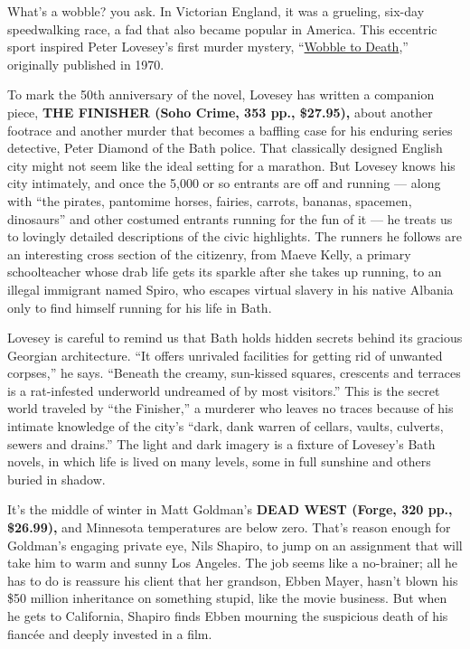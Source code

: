 What's a wobble? you ask. In Victorian England, it was a grueling,
six-day speedwalking race, a fad that also became popular in America.
This eccentric sport inspired Peter Lovesey's first murder mystery,
``\href{https://www.theguardian.com/science/blog/2012/jun/19/sports-doping-victorian-style}{Wobble
to Death},'' originally published in 1970.

To mark the 50th anniversary of the novel, Lovesey has written a
companion piece, \textbf{THE FINISHER (Soho Crime, 353 pp., \$27.95),}
about another footrace and another murder that becomes a baffling case
for his enduring series detective, Peter Diamond of the Bath police.
That classically designed English city might not seem like the ideal
setting for a marathon. But Lovesey knows his city intimately, and once
the 5,000 or so entrants are off and running --- along with ``the
pirates, pantomime horses, fairies, carrots, bananas, spacemen,
dinosaurs'' and other costumed entrants running for the fun of it --- he
treats us to lovingly detailed descriptions of the civic highlights. The
runners he follows are an interesting cross section of the citizenry,
from Maeve Kelly, a primary schoolteacher whose drab life gets its
sparkle after she takes up running, to an illegal immigrant named Spiro,
who escapes virtual slavery in his native Albania only to find himself
running for his life in Bath.

Lovesey is careful to remind us that Bath holds hidden secrets behind
its gracious Georgian architecture. ``It offers unrivaled facilities for
getting rid of unwanted corpses,'' he says. ``Beneath the creamy,
sun-kissed squares, crescents and terraces is a rat-infested underworld
undreamed of by most visitors.'' This is the secret world traveled by
``the Finisher,'' a murderer who leaves no traces because of his
intimate knowledge of the city's ``dark, dank warren of cellars, vaults,
culverts, sewers and drains.'' The light and dark imagery is a fixture
of Lovesey's Bath novels, in which life is lived on many levels, some in
full sunshine and others buried in shadow.

It's the middle of winter in Matt Goldman's \textbf{DEAD WEST (Forge,
320 pp., \$26.99),} and Minnesota temperatures are below zero. That's
reason enough for Goldman's engaging private eye, Nils Shapiro, to jump
on an assignment that will take him to warm and sunny Los Angeles. The
job seems like a no-brainer; all he has to do is reassure his client
that her grandson, Ebben Mayer, hasn't blown his \$50 million
inheritance on something stupid, like the movie business. But when he
gets to California, Shapiro finds Ebben mourning the suspicious death of
his fiancée and deeply invested in a film.

